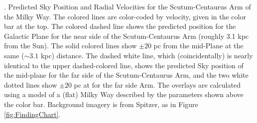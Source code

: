 \textbf{\label{fig:coloredlines}}. Predicted Sky Position and Radial Velocities for the Scutum-Centaurus Arm of the Milky Way.  The colored lines are color-coded by velocity, given in the color bar at the top.  The colored dashed line shows the predicted position for the Galactic Plane for the near side of the Scutum-Centaurus Arm (roughly 3.1 kpc from the Sun).  The solid colored lines show $\pm 20$ pc from the mid-Plane at the same ($\sim3.1$ kpc) distance.  The dashed white line, which (coincidentally) is nearly identical to the upper dashed-colored line, shows the predicted Sky position of the mid-plane for the far side of the Scutum-Centaurus Arm, and the two white dotted lines show  $\pm 20$ pc at for the far side Arm.  The overlays are calculated using a model of a (flat) Milky Way described by the parameters shown above the color bar. Background imagery is from Spitzer, as in Figure \ref{fig:FindingChart}.